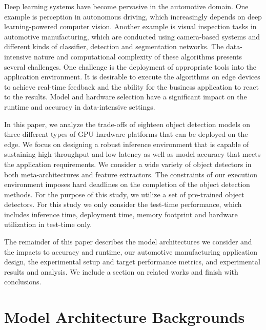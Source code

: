 \documentclass[conference]{IEEEtran}
\newcommand{\alnote}[1]{ {\textcolor{blue} { ***andre: #1 }}}
\newcommand{\alnote}[1]{}
\begin{document}
Deep learning systems have become pervasive in the automotive domain.
One example is  perception in autonomous driving, which increasingly depends on deep learning-powered computer vision. 
Another example is visual inspection tasks in automotive manufacturing, which are conducted using camera-based systems and different kinds of classifier, detection and segmentation networks. 
The data-intensive nature and computational complexity of these algorithms presents several challenges.
One challenge is the deployment of appropriate tools into the application environment. 
It is desirable to execute the algorithms on edge devices to achieve  real-time feedback and the ability for the business application to react to the results. 
Model and hardware selection have a significant impact on the runtime and accuracy in data-intensive settings.

In this paper, we analyze the trade-offs of eighteen object detection models on three different types of GPU hardware platforms that can be deployed on the edge.
We focus on designing a robust inference environment that is capable of sustaining high throughput and low latency as well as model accuracy that meets the application requirements. 
We consider a wide variety of object detectors in both meta-architectures and feature extractors.  The constraints of our execution environment imposes hard deadlines on the completion of the object detection methods.
For the purpose of this study, we utilize a set of pre-trained object detectors. 
For this study we only consider the test-time performance, which includes inference time, deployment time, memory footprint and hardware utilization in test-time only.


The remainder of this paper describes the model architectures we consider and the impacts to accuracy and runtime, our automotive manufacturing application design, the experimental setup and target performance metrics, and experimental results and analysis.  We include a section on related works and finish with conclusions.


\section{Model Architecture Backgrounds}

\end{document}
